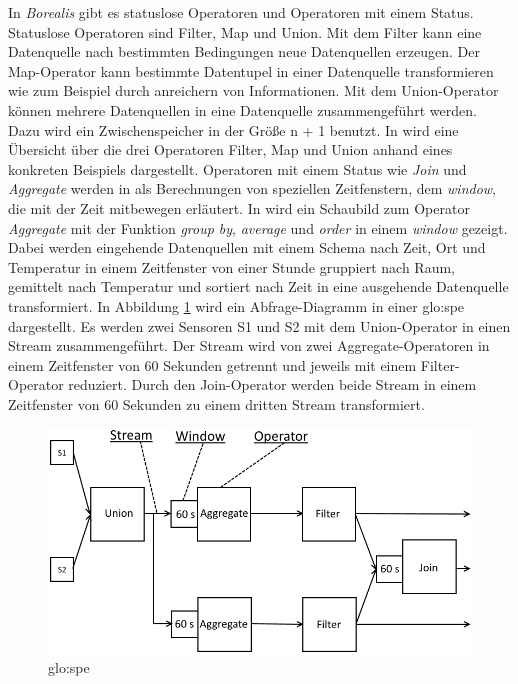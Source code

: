 In \textit{Borealis} gibt es statuslose Operatoren und Operatoren mit einem Status. Statuslose Operatoren sind Filter, Map und Union. Mit dem Filter kann eine Datenquelle nach bestimmten Bedingungen neue Datenquellen erzeugen. Der Map-Operator kann bestimmte Datentupel in einer Datenquelle transformieren wie zum Beispiel durch anreichern von Informationen. Mit dem Union-Operator können mehrere Datenquellen in eine Datenquelle zusammengeführt werden. Dazu wird ein Zwischenspeicher in der Größe n + 1 benutzt. In  wird eine Übersicht über die drei Operatoren Filter, Map und Union anhand eines konkreten Beispiels dargestellt. Operatoren mit einem Status wie \textit{Join} und \textit{Aggregate} werden in \cite[S. 9, Kap. 3.2.2 Stateful Operators]{borealis:programmer} als Berechnungen von speziellen Zeitfenstern, dem \textit{window}, die mit der Zeit mitbewegen erläutert. In \cite[S. 10, Abb. 3.2 Sample output from an aggregate operator]{borealis:programmer} wird ein Schaubild zum Operator \textit{Aggregate} mit der Funktion \textit{group by}, \textit{average} und \textit{order} in einem \textit{window} gezeigt. Dabei werden eingehende Datenquellen mit einem Schema nach Zeit, Ort und Temperatur in einem Zeitfenster von einer Stunde gruppiert nach Raum, gemittelt nach Temperatur und sortiert nach Zeit in eine ausgehende Datenquelle transformiert. In Abbildung \ref{fig:querydiagramspe} wird ein Abfrage-Diagramm in einer \acrlong{glo:spe} dargestellt. Es werden zwei Sensoren S1 und S2 mit dem Union-Operator in einen Stream zusammengeführt. Der Stream wird von zwei Aggregate-Operatoren in einem Zeitfenster von 60 Sekunden getrennt und jeweils mit einem Filter-Operator reduziert. Durch den Join-Operator werden beide Stream in einem Zeitfenster von 60 Sekunden zu einem dritten Stream transformiert.

\begin{figure}[htb!]
\centering
\includegraphics[width=1.0\textwidth]{bilder/QueryDiagram.png}
\caption{\acrlong{glo:spe}\label{fig:querydiagramspe}}
\end{figure}


